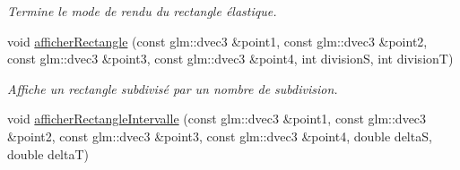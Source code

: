 \begin{DoxyCompactItemize}
\begin{DoxyCompactList}\small\item\em Termine le mode de rendu du rectangle élastique. \end{DoxyCompactList}\item 
void \hyperlink{namespaceaidegl_ab9d35d5387a501181fe379dd596bd25d}{afficher\+Rectangle} (const glm\+::dvec3 \&point1, const glm\+::dvec3 \&point2, const glm\+::dvec3 \&point3, const glm\+::dvec3 \&point4, int division\+S, int division\+T)
\begin{DoxyCompactList}\small\item\em Affiche un rectangle subdivisé par un nombre de subdivision. \end{DoxyCompactList}\item 
\hypertarget{namespaceaidegl_a6775d81c7b7b695dcfb3f3d50cc253a5}{}void \hyperlink{namespaceaidegl_a6775d81c7b7b695dcfb3f3d50cc253a5}{afficher\+Rectangle\+Intervalle} (const glm\+::dvec3 \&point1, const glm\+::dvec3 \&point2, const glm\+::dvec3 \&point3, const glm\+::dvec3 \&point4, double delta\+S, double delta\+T)\label{namespaceaidegl_a6775d81c7b7b695dcfb3f3d50cc253a5}


\end{DoxyCompactItemize}
